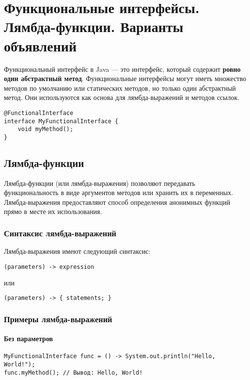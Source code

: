 \documentclass[12pt, a4paper]{article}
\begin{document}
\section{Функциональные интерфейсы. Лямбда-функции. Варианты объявлений}
Функциональный интерфейс в Java — это интерфейс, который содержит \textbf{ровно один абстрактный метод}. Функциональные интерфейсы могут иметь множество методов по умолчанию или статических методов, но только один абстрактный метод. Они используются как основа для лямбда-выражений и методов ссылок.

\begin{verbatim}
@FunctionalInterface
interface MyFunctionalInterface {
    void myMethod();
}
\end{verbatim}

\subsection*{Лямбда-функции}
Лямбда-функции (или лямбда-выражения) позволяют передавать функциональность в виде аргументов методов или хранить их в переменных. Лямбда-выражения предоставляют способ определения анонимных функций прямо в месте их использования.

\subsubsection*{Синтаксис лямбда-выражений}
Лямбда-выражения имеют следующий синтаксис:

\begin{verbatim}
(parameters) -> expression
\end{verbatim}

или

\begin{verbatim}
(parameters) -> { statements; }
\end{verbatim}

\subsubsection*{Примеры лямбда-выражений}

\paragraph{Без параметров}
\begin{verbatim}
MyFunctionalInterface func = () -> System.out.println("Hello, World!");
func.myMethod(); // Вывод: Hello, World!
\end{verbatim}
\end{document}
